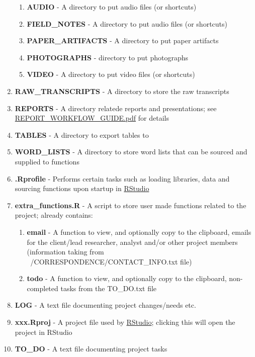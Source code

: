 \documentclass{article}\usepackage{graphicx, color}
\begin{document}
\begin{enumerate}
  \begin{enumerate}
     \item \textbf{AUDIO} - A directory to put audio files (or shortcuts)
     \item \textbf{FIELD\_NOTES} - A directory to put audio files (or shortcuts)
     \item \textbf{PAPER\_ARTIFACTS} - A directory to put paper artifacts 
     \item \textbf{PHOTOGRAPHS} - directory to put photographs
     \item \textbf{VIDEO} - A directory to put video files (or shortcuts)
  \end{enumerate}  
  \item \textbf{RAW\_TRANSCRIPTS} - A directory to store the raw transcripts
  \item \textbf{REPORTS} - A directory relatede reports and presentations; see \href{https://dl.dropbox.com/u/61803503/packages/REPORT_WORKFLOW_GUIDE.pdf}{REPORT\_WORKFLOW\_GUIDE.pdf} for details
  \item \textbf{TABLES} - A directory to export tables to 
  \item \textbf{WORD\_LISTS} - A directory to store word lists that can be sourced and supplied to functions
  \item \textbf{.Rprofile} - Performs certain tasks such as loading libraries, 
      data and sourcing functions upon startup in \href{http://www.rstudio.com/}{RStudio}
  \item \textbf{extra\_functions.R} - A script to store user made functions related to the project; already contains:
  \begin{enumerate}
     \item \textbf{email} - A function to view, and optionally copy to the clipboard, emails for the client/lead researcher, analyst and/or other project members (information taking from ~/CORRESPONDENCE/CONTACT\_INFO.txt file)
     \item \textbf{todo} - A function to view, and optionally copy to the clipboard, non-completed tasks from the TO\_DO.txt file
  \end{enumerate}   
  \item \textbf{LOG} - A text file documenting project changes/needs etc.
  \item \textbf{xxx.Rproj} - A project file used by \href{http://www.rstudio.com/}{RStudio}; clicking this will open the project in RStudio
  \item \textbf{TO\_DO} - A text file documenting project tasks 
\end{enumerate}
\end{document}
